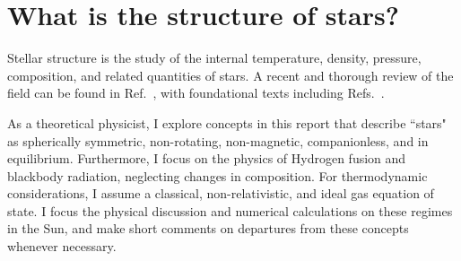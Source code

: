 \documentclass[12pt]{article}
\begin{document}
\section{What is the structure of stars?} \label{sec:structure}
Stellar structure is the study of the internal temperature, density, pressure, composition, and related quantities of stars. A recent and thorough review of the field can be found in Ref.~\cite{Christensen_Dalsgaard_2021}, with foundational texts including Refs.~\cite{Lane1870, Eddington1926, Chandrasekhar1939}.

As a theoretical physicist, I explore concepts in this report that describe ``stars" as spherically symmetric, non-rotating, non-magnetic, companionless, and in equilibrium. Furthermore, I focus on the physics of Hydrogen fusion and blackbody radiation, neglecting changes in composition. For thermodynamic considerations, I assume a classical, non-relativistic, and ideal gas equation of state. I focus the physical discussion and numerical calculations on these regimes in the Sun, and make short comments on departures from these concepts whenever necessary.
\end{document}
